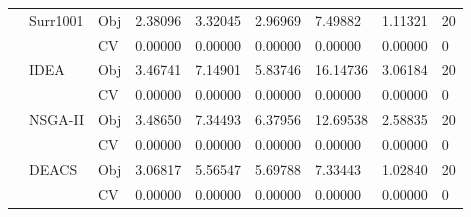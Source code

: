 \begin{table*}[!htb]
\begin{tabular}{lllllllll}
		& Surr1001                           & Obj                                & 2.38096                            & 3.32045                            & 2.96969                              & 7.49882                             & 1.11321                           & 20               \\
		&                                    & CV                                 & 0.00000                            & 0.00000                            & 0.00000                              & 0.00000                             & 0.00000                           & 0                \\
		& IDEA                               & Obj                                & 3.46741                            & 7.14901                            & 5.83746                              & 16.14736                            & 3.06184                           & 20               \\
		&                                    & CV                                 & 0.00000                            & 0.00000                            & 0.00000                              & 0.00000                             & 0.00000                           & 0                \\
		& NSGA-II                            & Obj                                & 3.48650                            & 7.34493                            & 6.37956                              & 12.69538                            & 2.58835                           & 20               \\
		&                                    & CV                                 & 0.00000                            & 0.00000                            & 0.00000                              & 0.00000                             & 0.00000                           & 0                \\
		& DEACS                              & Obj                                & 3.06817                            & 5.56547                            & 5.69788                              & 7.33443                             & 1.02840                           & 20               \\
		&                                    & CV                                 & 0.00000                            & 0.00000                            & 0.00000                              & 0.00000                             & 0.00000                           & 0                \\

\end{tabular}
\end{table*}
